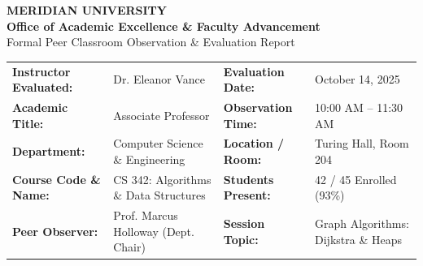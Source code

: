 \documentclass[10pt,a4paper]{article}
\begin{document}

\begin{headerbox}
  \begin{minipage}[c]{0.70\textwidth}
    {\color{white}\huge\bfseries MERIDIAN UNIVERSITY}\\[3pt]
    {\color{TealLight}\large\bfseries Office of Academic Excellence \& Faculty Advancement}\\[2pt]
    {\color{white}\small Formal Peer Classroom Observation \& Evaluation Report}
  \end{minipage}%
  \hfill
  \begin{minipage}[c]{0.26\textwidth}
    \raggedleft
  \end{minipage}
\end{headerbox}

\vspace{8pt}

\begin{infocard}
  \begin{tabularx}{\textwidth}{@{}l X l X@{}}
    \textbf{\color{NavyPrimary}Instructor Evaluated:} & Dr. Eleanor Vance & \textbf{\color{NavyPrimary}Evaluation Date:} & October 14, 2025 \\
    \textbf{\color{NavyPrimary}Academic Title:} & Associate Professor & \textbf{\color{NavyPrimary}Observation Time:} & 10:00 AM -- 11:30 AM \\
    \textbf{\color{NavyPrimary}Department:} & Computer Science \& Engineering & \textbf{\color{NavyPrimary}Location / Room:} & Turing Hall, Room 204 \\
    \textbf{\color{NavyPrimary}Course Code \& Name:} & CS 342: Algorithms \& Data Structures & \textbf{\color{NavyPrimary}Students Present:} & 42 / 45 Enrolled (93\%) \\
    \textbf{\color{NavyPrimary}Peer Observer:} & Prof. Marcus Holloway (Dept. Chair) & \textbf{\color{NavyPrimary}Session Topic:} & Graph Algorithms: Dijkstra \& Heaps \\
  \end{tabularx}
\end{infocard}
\end{document}
